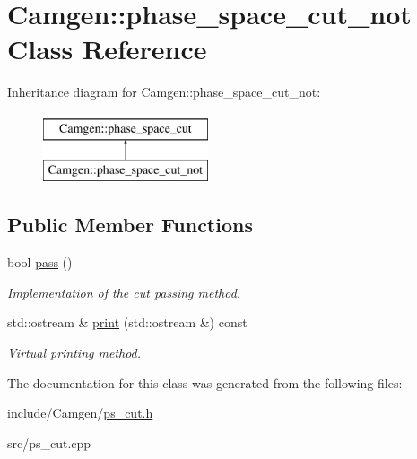 \hypertarget{a00415}{\section{Camgen\-:\-:phase\-\_\-space\-\_\-cut\-\_\-not Class Reference}
\label{a00415}
}
Inheritance diagram for Camgen\-:\-:phase\-\_\-space\-\_\-cut\-\_\-not\-:\begin{figure}[H]
\begin{center}
\leavevmode
\includegraphics[height=2.000000cm]{a00415}
\end{center}
\end{figure}
\subsection*{Public Member Functions}
\begin{DoxyCompactItemize}
\item 
\hypertarget{a00415_ac098fe2985aec376549335065cb69b67}{bool \hyperlink{a00415_ac098fe2985aec376549335065cb69b67}{pass} ()}\label{a00415_ac098fe2985aec376549335065cb69b67}

\begin{DoxyCompactList}\small\item\em Implementation of the cut passing method. \end{DoxyCompactList}\item 
\hypertarget{a00415_ae428e1eb98edf7df356eefff2cf9372a}{std\-::ostream \& \hyperlink{a00415_ae428e1eb98edf7df356eefff2cf9372a}{print} (std\-::ostream \&) const }\label{a00415_ae428e1eb98edf7df356eefff2cf9372a}

\begin{DoxyCompactList}\small\item\em Virtual printing method. \end{DoxyCompactList}\end{DoxyCompactItemize}


The documentation for this class was generated from the following files\-:\begin{DoxyCompactItemize}
\item 
include/\-Camgen/\hyperlink{a00713}{ps\-\_\-cut.\-h}\item 
src/ps\-\_\-cut.\-cpp\end{DoxyCompactItemize}
